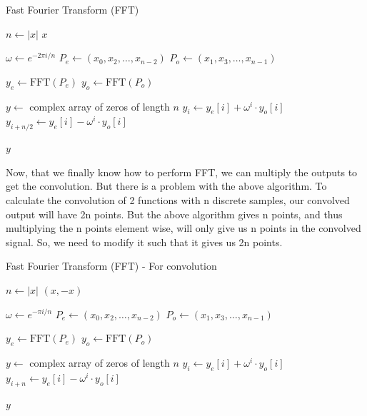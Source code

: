 \begin{algorithm}[!ht]
\caption{Fast Fourier Transform (FFT)}
\begin{algorithmic}[1]
    \State $n \gets |x|$ 
        \State \Return $x$
    \EndIf
    
    \State $\omega \gets e^{-2\pi i / n}$ 
    \State $P_e \gets (x_0, x_2, \ldots, x_{n-2})$ 
    \State $P_o \gets (x_1, x_3, \ldots, x_{n-1})$ 
    
    \State $y_e \gets \text{FFT}(P_e)$ 
    \State $y_o \gets \text{FFT}(P_o)$ 
    
    \State $y \gets $ complex array of zeros of length $n$ 
        \State $y_i \gets y_e[i] + \omega^i \cdot y_o[i]$ 
        \State $y_{i+n/2} \gets y_e[i] - \omega^i \cdot y_o[i]$ 
    \EndFor
    
    \State \Return $y$
\EndProcedure
\end{algorithmic}
\end{algorithm}

Now, that we finally know how to perform FFT, we can multiply the outputs to get the convolution. But there is a problem with the above algorithm. To calculate the convolution of 2 functions with n discrete samples, our convolved output will have 2n points. But the above algorithm gives n points, and thus multiplying the n points element wise, will only give us n points in the convolved signal. So, we need to modify it such that it gives us 2n points.


\begin{algorithm}[!ht]
\caption{Fast Fourier Transform (FFT) - For convolution}
\begin{algorithmic}[1]
    \State $n \gets |x|$ 
    \State \Return $(x, -x)$
    \EndIf
    
    \State $\omega \gets e^{-\pi i / n}$ 
    \State $P_e \gets (x_0, x_2, \ldots, x_{n-2})$ 
    \State $P_o \gets (x_1, x_3, \ldots, x_{n-1})$ 
    
    \State $y_e \gets \text{FFT}(P_e)$ 
    \State $y_o \gets \text{FFT}(P_o)$ 
    
    \State $y \gets $ complex array of zeros of length $n$ 
        \State $y_i \gets y_e[i] + \omega^i \cdot y_o[i]$ 
        \State $y_{i+n} \gets y_e[i] - \omega^i \cdot y_o[i]$ 
    \EndFor
    
    \State \Return $y$
\EndProcedure
\end{algorithmic}
\end{algorithm}



